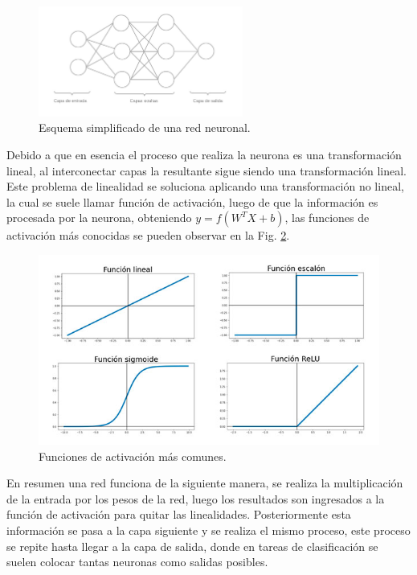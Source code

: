 \begin{figure}[h]
    \centering
    \includegraphics[width=0.6\textwidth]{imgs/Redes-esquema.jpg}
    \caption{Esquema simplificado de una red neuronal.}
    \label{fig:esquema-redes}
\end{figure}

Debido a que en esencia el proceso que realiza la neurona es una transformación lineal, al interconectar capas la resultante sigue siendo una transformación lineal.
Este problema de linealidad se soluciona aplicando una transformación no lineal, la cual se suele llamar función de activación,
luego de que la información es procesada por la neurona, obteniendo $y= f(W^T X + b)$, las funciones de activación más conocidas se pueden observar en la Fig. \ref{fig:funciones-activacion}.

\begin{figure}
    \centering
    \includegraphics[width=1\textwidth]{imgs/Funciones-de-activacion.jpg}
    \caption{Funciones de activación más comunes.}
    \label{fig:funciones-activacion}
\end{figure}

En resumen una red funciona de la siguiente manera, se realiza la multiplicación de la entrada por los pesos de la red, luego los resultados son ingresados a la función de activación para quitar las linealidades. Posteriormente esta información se pasa a la capa siguiente y se realiza el mismo proceso, este proceso se repite hasta llegar a la capa de salida, donde en tareas de clasificación se suelen colocar tantas neuronas como salidas posibles.

